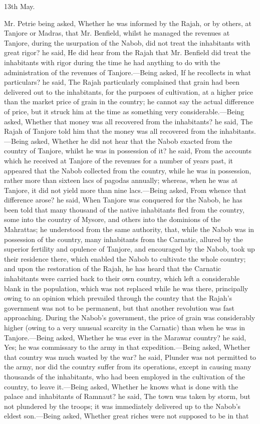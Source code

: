 \vspace{0.3cm}
\hfill 13th May.

Mr. Petrie being asked, Whether he was informed by the Rajah, or by others, at Tanjore or Madras, that Mr. Benfield, whilst he managed the revenues at Tanjore, during the usurpation of the Nabob, did not treat the inhabitants with great rigor? he said, He did hear from the Rajah that Mr. Benfield did treat the inhabitants with rigor during the time he had anything to do with the administration of the revenues of Tanjore.—Being asked, If he recollects in what particulars? he said, The Rajah particularly complained that grain had been delivered out to the inhabitants, for the purposes of cultivation, at a higher price than the market price of grain in the country; he cannot say the actual difference of price, but it struck him at the time as something very considerable.—Being asked, Whether that money was all recovered from the inhabitants? he said, The Rajah of Tanjore told him that the money was all recovered from the inhabitants.—Being asked, Whether he did not hear that the Nabob exacted from the country of Tanjore, whilst he was in possession of it? he said, From the accounts which he received at Tanjore of the revenues for a number of years past, it appeared that the Nabob collected from the country, while he was in possession, rather more than sixteen lacs of pagodas annually; whereas, when he was at Tanjore, it did not yield more than nine lacs.—Being asked, From whence that difference arose? he said, When Tanjore was conquered for the Nabob, he has been told that many thousand of the native inhabitants fled from the country, some into the country of Mysore, and others into the dominions of the Mahrattas; he understood from the same authority, that, while the Nabob was in possession of the country, many inhabitants from the Carnatic, allured by the superior fertility and opulence of Tanjore, and encouraged by the Nabob, took up their residence there, which enabled the Nabob to cultivate the whole country; and upon the restoration of the Rajah, he has heard that the Carnatic inhabitants were carried back to their own country, which left a considerable blank in the population, which was not replaced while he was there, principally owing to an opinion which prevailed through the country that the Rajah's government was not to be permanent, but that another revolution was fast approaching. During the Nabob's government, the price of grain was considerably higher (owing to a very unusual scarcity in the Carnatic) than when he was in Tanjore.—Being asked, Whether he was ever in the Marawar country? he said, Yes; he was commissary to the army in that expedition.—Being asked, Whether that country was much wasted by the war? he said, Plunder was not permitted to the army, nor did the country suffer from its operations, except in causing many thousands of the inhabitants, who had been employed in the cultivation of the country, to leave it.—Being asked, Whether he knows what is done with the palace and inhabitants of Ramnaut? he said, The town was taken by storm, but not plundered by the troops; it was immediately delivered up to the Nabob's eldest son.—Being asked, Whether great riches were not supposed to be in that 